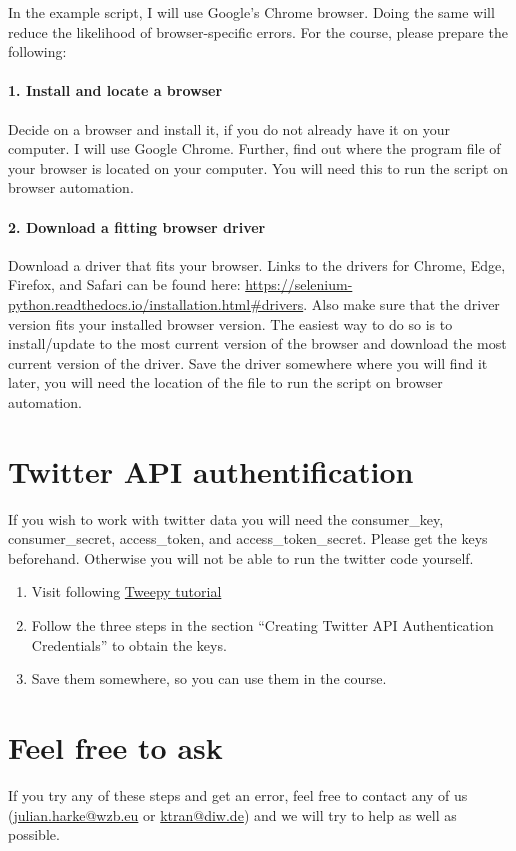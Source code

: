\documentclass[a4paper]{article}
\begin{document}
In the example script, I will use Google's Chrome browser. Doing the same will reduce the likelihood of browser-specific errors. For the course, please prepare the following:

\paragraph{1. Install and locate a browser} Decide on a browser and install it, if you do not already have it on your computer. I will use Google Chrome. Further, find out where the program file of your browser is located on your computer. You will need this to run the script on browser automation.

\paragraph{2. Download a fitting browser driver} Download a driver that fits your browser. Links to the drivers for Chrome, Edge, Firefox, and Safari can be found here: \url{https://selenium-python.readthedocs.io/installation.html#drivers}. Also make sure that the driver version fits your installed browser version. The easiest way to do so is to install/update to the most current version of the browser and download the most current version of the driver. Save the driver somewhere where you will find it later, you will need the location of the file to run the script on browser automation.

\section{Twitter API authentification}

If you wish to work with twitter data you will need the consumer\_key,
consumer\_secret, access\_token, and access\_token\_secret. Please get
the keys beforehand. Otherwise you will not be able to run the twitter
code yourself.

\begin{enumerate}
    \item Visit following \href{https://realpython.com/twitter-bot-python-tweepy/#creating-twitter-api-authentication-credentials}{Tweepy tutorial}
    \item Follow the three steps in the section ``Creating Twitter API
    Authentication Credentials'' to obtain the keys.
    \item Save them somewhere, so you can use them in the course.
\end{enumerate}

\section{Feel free to ask}

If you try any of these steps and get an error, feel free to contact any of us (\href{mailto:julian.harke@wzb.eu}{julian.harke@wzb.eu} or \href{mailto:ktran@diw.de}{ktran@diw.de}) and we will try to help as well as possible.
\end{document}
